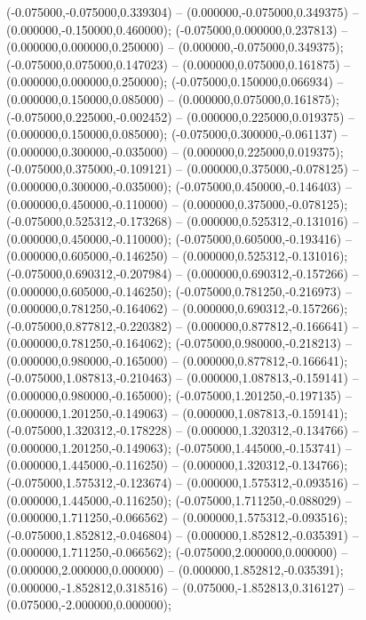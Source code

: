  (-0.075000,-0.075000,0.339304) -- (0.000000,-0.075000,0.349375) -- (0.000000,-0.150000,0.460000);
 (-0.075000,0.000000,0.237813) -- (0.000000,0.000000,0.250000) -- (0.000000,-0.075000,0.349375);
 (-0.075000,0.075000,0.147023) -- (0.000000,0.075000,0.161875) -- (0.000000,0.000000,0.250000);
 (-0.075000,0.150000,0.066934) -- (0.000000,0.150000,0.085000) -- (0.000000,0.075000,0.161875);
 (-0.075000,0.225000,-0.002452) -- (0.000000,0.225000,0.019375) -- (0.000000,0.150000,0.085000);
 (-0.075000,0.300000,-0.061137) -- (0.000000,0.300000,-0.035000) -- (0.000000,0.225000,0.019375);
 (-0.075000,0.375000,-0.109121) -- (0.000000,0.375000,-0.078125) -- (0.000000,0.300000,-0.035000);
 (-0.075000,0.450000,-0.146403) -- (0.000000,0.450000,-0.110000) -- (0.000000,0.375000,-0.078125);
 (-0.075000,0.525312,-0.173268) -- (0.000000,0.525312,-0.131016) -- (0.000000,0.450000,-0.110000);
 (-0.075000,0.605000,-0.193416) -- (0.000000,0.605000,-0.146250) -- (0.000000,0.525312,-0.131016);
 (-0.075000,0.690312,-0.207984) -- (0.000000,0.690312,-0.157266) -- (0.000000,0.605000,-0.146250);
 (-0.075000,0.781250,-0.216973) -- (0.000000,0.781250,-0.164062) -- (0.000000,0.690312,-0.157266);
 (-0.075000,0.877812,-0.220382) -- (0.000000,0.877812,-0.166641) -- (0.000000,0.781250,-0.164062);
 (-0.075000,0.980000,-0.218213) -- (0.000000,0.980000,-0.165000) -- (0.000000,0.877812,-0.166641);
 (-0.075000,1.087813,-0.210463) -- (0.000000,1.087813,-0.159141) -- (0.000000,0.980000,-0.165000);
 (-0.075000,1.201250,-0.197135) -- (0.000000,1.201250,-0.149063) -- (0.000000,1.087813,-0.159141);
 (-0.075000,1.320312,-0.178228) -- (0.000000,1.320312,-0.134766) -- (0.000000,1.201250,-0.149063);
 (-0.075000,1.445000,-0.153741) -- (0.000000,1.445000,-0.116250) -- (0.000000,1.320312,-0.134766);
 (-0.075000,1.575312,-0.123674) -- (0.000000,1.575312,-0.093516) -- (0.000000,1.445000,-0.116250);
 (-0.075000,1.711250,-0.088029) -- (0.000000,1.711250,-0.066562) -- (0.000000,1.575312,-0.093516);
 (-0.075000,1.852812,-0.046804) -- (0.000000,1.852812,-0.035391) -- (0.000000,1.711250,-0.066562);
 (-0.075000,2.000000,0.000000) -- (0.000000,2.000000,0.000000) -- (0.000000,1.852812,-0.035391);
 (0.000000,-1.852812,0.318516) -- (0.075000,-1.852813,0.316127) -- (0.075000,-2.000000,0.000000);
